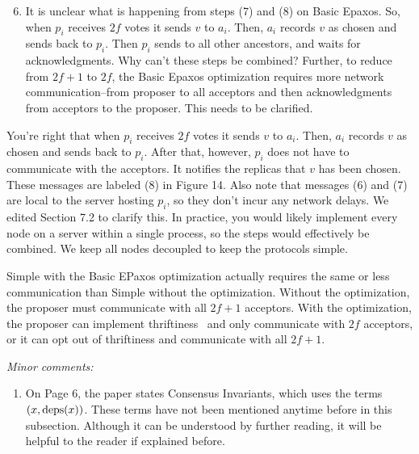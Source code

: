 \documentclass[letterpaper,twocolumn,10pt]{article}
\newenvironment{reviewerquote}
{\list{}{\leftmargin=\parindent\rightmargin=0in}\item[] \itshape \color{ReviewerDarkGray}}%
{\endlist}
\begin{document}
\begin{reviewerquote}
  \begin{enumerate}
    \setcounter{enumi}{5}
    \item
      It is unclear what is happening from steps (7) and (8) on Basic Epaxos.
      So, when $p_i$ receives $2f$ votes it sends $v$ to $a_i$. Then, $a_i$
      records $v$ as chosen and sends back to $p_i$. Then $p_i$ sends to all
      other ancestors, and waits for acknowledgments. Why can't these steps be
      combined? Further, to reduce from $2f+1$ to $2f$, the Basic Epaxos
      optimization requires more network communication--from proposer to all
      acceptors and then acknowledgments from acceptors to the proposer. This
      needs to be clarified.
  \end{enumerate}
\end{reviewerquote}

You're right that when $p_i$ receives $2f$ votes it sends $v$ to $a_i$. Then,
$a_i$ records $v$ as chosen and sends back to $p_i$. After that, however, $p_i$
does not have to communicate with the acceptors. It notifies the replicas that
$v$ has been chosen. These messages are labeled (8) in Figure 14. Also note
that messages (6) and (7) are local to the server hosting $p_i$, so they don't
incur any network delays. We edited Section 7.2 to clarify this. In practice,
you would likely implement every node on a server within a single process, so
the steps would effectively be combined. We keep all nodes decoupled to keep
the protocols simple.

Simple \BPaxos{} with the Basic EPaxos optimization actually requires the same
or less communication than Simple \BPaxos{} without the optimization. Without
the optimization, the proposer must communicate with all $2f+1$ acceptors. With
the optimization, the proposer can implement thriftiness~\cite{moraru2013there}
and only communicate with $2f$ acceptors, or it can opt out of thriftiness and
communicate with all $2f+1$.

\begin{reviewerquote}
  Minor comments:

  \begin{enumerate}
    \setcounter{enumi}{0}
    \item
      On Page 6, the paper states Consensus Invariants, which uses the terms
      $(x, \text{deps}(x))$. These terms have not been mentioned anytime before in
      this subsection. Although it can be understood by further reading, it
      will be helpful to the reader if explained before.
  \end{enumerate}
\end{reviewerquote}
\end{document}
